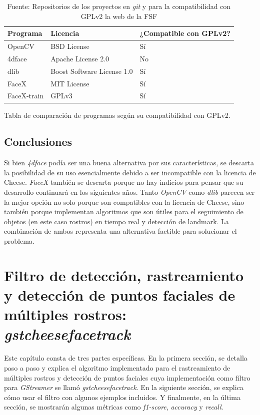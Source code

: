 \documentclass[a4paper,openright,12pt]{report}
\begin{document}
\begin{center}
	\begin{table}[h]
      \begin{tabular}{| l | l | l |}
      \hline
      Programa & Licencia & ¿Compatible con GPLv2? \\ \hline
      OpenCV & BSD License & Sí \\ \hline
      4dface & Apache License 2.0 & No \\ \hline
      dlib & Boost Software License 1.0 & Sí \\ \hline
      FaceX & MIT License & Sí \\ \hline
      FaceX-train & GPLv3 & Sí \\ \hline
      \end{tabular}
      \caption{Tabla de comparación de programas según su compatibilidad con GPLv2.}
      \caption*{Fuente: Repositorios de los proyectos en \textit{git}
                \cite{openCVLicense}\cite{dlibLicense2}\cite{faceXLicense}
                \cite{4dfaceLicense} y para la compatibilidad con GPLv2 la web de
                la FSF \cite{GPLv2Compatibility}}
	\end{table}
\end{center}


\section{Conclusiones}
Si bien \textit{4dface} podía ser una buena alternativa por sus características,
se descarta la posibilidad de su uso esencialmente debido a ser incompatible
con la licencia de Cheese. \textit{FaceX} también se descarta porque no hay
indicios para pensar que su desarrollo continuará en los siguientes años. Tanto
\textit{OpenCV} como \textit{dlib} parecen ser la mejor opción no solo porque
son compatibles con la licencia de Cheese, sino también porque implementan
algoritmos que son útiles para el seguimiento de objetos (en este caso rostros)
en tiempo real y detección de landmark. La combinación de ambos representa una
alternativa factible para solucionar el problema.

\chapter{Filtro de detección, rastreamiento y detección de puntos faciales de
múltiples rostros: \textit{gstcheesefacetrack}}
Este capítulo consta de tres partes específicas. En la primera sección, se
detalla paso a paso y explica el algoritmo implementado para el rastreamiento de
múltiples rostros y detección de puntos faciales cuya implementación como filtro
para \textit{GStreamer} se llamó \textit{gstcheesefacetrack}. En la siguiente
sección, se explica cómo usar el filtro con algunos ejemplos incluidos. Y
finalmente, en la última sección, se mostrarán algunas métricas como
\textit{f1-score}, \textit{accuracy} y \textit{recall}.
\end{document}
